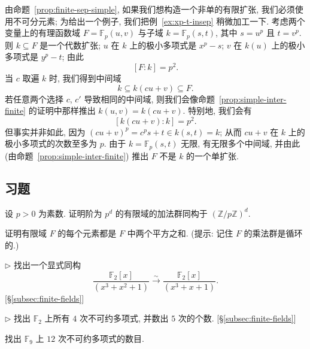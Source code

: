 \begin{example}\label{ex:non-simple-insep}
由命题~\ref{prop:finite-sep-simple}, 如果我们想构造一个非单的有限扩张, 我们必须使用不可分元素; 为给出一个例子, 我们把例~\ref{ex:xp-t-insep} 稍微加工一下. 考虑两个变量上的有理函数域 $F=\mathbb{F}_p(u,v)$ 与子域 $k=\mathbb{F}_p(s,t)$, 其中 $s=u^p$ 且 $t=v^p$. 则 $k\subseteq F$ 是一个代数扩张; $u$ 在 $k$ 上的极小多项式是 $x^p-s$; $v$ 在 $k(u)$ 上的极小多项式是 $y^p-t$; 由此
\[
[F:k]=p^2.
\]
当 $c$ 取遍 $k$ 时, 我们得到中间域
\[
k\subseteq k(cu+v)\subseteq F.
\]
若任意两个选择 $c$, $c'$ 导致相同的中间域, 则我们会像命题~\ref{prop:simple-inter-finite} 的证明中那样推出 $k(u,v)=k(cu+v)$. 特别地, 我们会有
\[
[k(cu+v):k]=p^2.
\]
但事实并非如此, 因为 $(cu+v)^p=c^ps+t\in k(s,t)=k$; 从而 $cu+v$ 在 $k$ 上的极小多项式的次数至多为 $p$. 由于 $k=\mathbb{F}_p(s,t)$ 无限, 有无限多个中间域, 并由此 (由命题~\ref{prop:simple-inter-finite}) 推出 $F$ 不是 $k$ 的一个单扩张.
\end{example}

\subsection*{习题}
{}

\begin{prob}\label{ex:finite-field-additive}
设 $p>0$ 为素数. 证明阶为 $p^d$ 的有限域的加法群同构于 $(\mathbb{Z}/p\mathbb{Z})^d$.
\end{prob}

\begin{prob}\label{ex:sum-of-two-squares}
证明有限域 $F$ 的每个元素都是 $F$ 中两个平方之和. (提示: 记住 $F$ 的乘法群是循环的.)
\end{prob}

\begin{prob}\label{ex:finite-field-iso-F8}
$\triangleright$ 找出一个显式同构
\[
\frac{\mathbb{F}_2[x]}{(x^3+x^2+1)}\xrightarrow{\sim}\frac{\mathbb{F}_2[x]}{(x^3+x+1)}.
\]
[§\ref{subsec:finite-fields}]
\end{prob}

\begin{prob}\label{ex:irred-deg4-F2}
$\triangleright$ 找出 $\mathbb{F}_2$ 上所有 $4$ 次不可约多项式, 并数出 $5$ 次的个数. [§\ref{subsec:finite-fields}]
\end{prob}

\begin{prob}\label{ex:irred-deg12-F9}
找出 $\mathbb{F}_9$ 上 $12$ 次不可约多项式的数目.
\end{prob}

